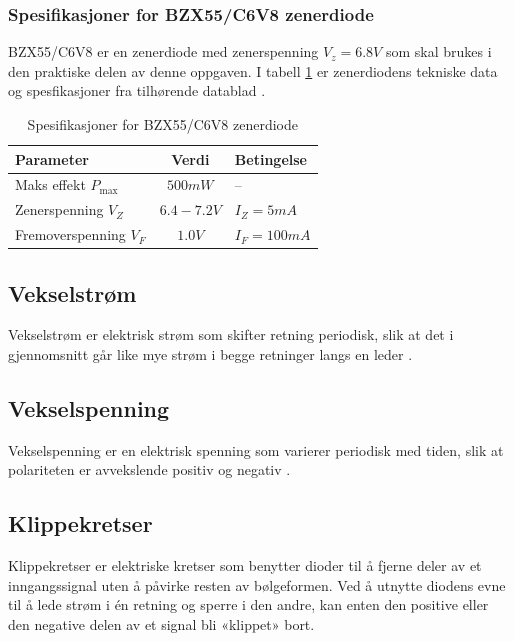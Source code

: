         \subsubsection{Spesifikasjoner for BZX55/C6V8 zenerdiode}
            BZX55/C6V8 er en zenerdiode med zenerspenning $V_z = 6.8V$ som skal brukes i den praktiske delen av denne oppgaven. I tabell \ref{tab:zenerdiode_data} er zenerdiodens tekniske data og spesfikasjoner fra tilhørende datablad \cite{bzx55}. 
            \begin{table}[H]
                \centering
                \caption{Spesifikasjoner for BZX55/C6V8 zenerdiode}
                \label{tab:zenerdiode_data}
                \begin{tabular}{|l|c|l|}
                \hline
                \textbf{Parameter} & \textbf{Verdi} & \textbf{Betingelse} \\ \hline
                Maks effekt $P_{\text{max}}$ & $500mW$ & -- \\ \hline
                Zenerspenning $V_Z$ & $6.4 - 7.2V$ & $I_Z = 5mA$ \\ \hline
                Fremoverspenning $V_F$ & $1.0V$ & $I_F = 100mA$ \\ \hline
                \end{tabular}
            \end{table}

    \subsection{Vekselstrøm}
        Vekselstrøm er elektrisk strøm som skifter retning periodisk, slik at det i gjennomsnitt går like mye strøm i begge retninger langs en leder \cite{vekselstrom}.

    \subsection{Vekselspenning}
        Vekselspenning er en elektrisk spenning som varierer periodisk med tiden, slik at polariteten er avvekslende positiv og negativ \cite{vekselsspenning}.

    \subsection{Klippekretser}
        Klippekretser er elektriske kretser som benytter dioder til å fjerne deler av et inngangssignal uten å påvirke resten av bølgeformen. Ved å utnytte diodens evne til å lede strøm i én retning og sperre i den andre, kan enten den positive eller den negative delen av et signal bli «klippet» bort.

